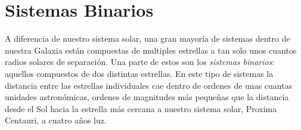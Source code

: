 \section{Sistemas Binarios}

A diferencia de nuestro sistema solar, una gran mayoría de sistemas dentro de
nuestra Galaxia están compuestas de multiples estrellas a tan solo unos cuantos
radios solares de separación. Una parte de estos son los \textit{sistemas
binarios}: aquellos compuestos de dos distintas estrellas. En este tipo de
sistemas la distancia entre las estrellas individuales cae dentro de ordenes de
unas cuantas unidades astronómicas, ordenes de magnitudes más pequeñas que la
distancia desde el Sol hacia la estrella más cercana a nuestro sistema solar,
Proxima Centauri, a cuatro años luz. 


